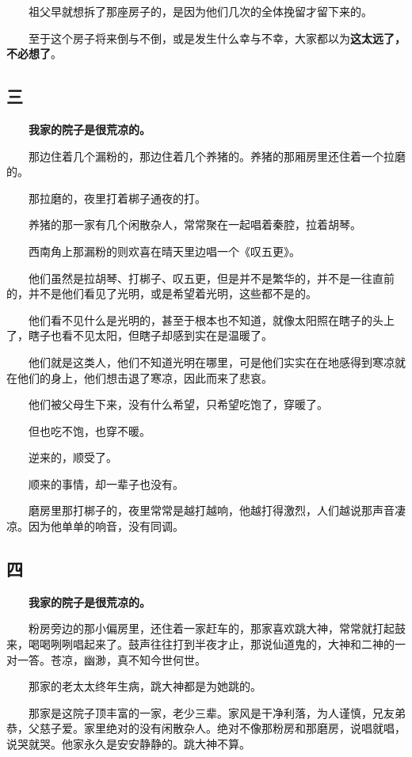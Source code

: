\documentclass[UTF8]{ctexart}
\begin{document}
　　祖父早就想拆了那座房子的，是因为他们几次的全体挽留才留下来的。

　　至于这个房子将来倒与不倒，或是发生什么幸与不幸，大家都以为\textbf{这太远了，不必想了}。

\subsection{三}

　　\textbf{我家的院子是很荒凉的。}

　　那边住着几个漏粉的，那边住着几个养猪的。养猪的那厢房里还住着一个拉磨的。

　　那拉磨的，夜里打着梆子通夜的打。

　　养猪的那一家有几个闲散杂人，常常聚在一起唱着秦腔，拉着胡琴。

　　西南角上那漏粉的则欢喜在晴天里边唱一个《叹五更》。

　　他们虽然是拉胡琴、打梆子、叹五更，但是并不是繁华的，并不是一往直前的，并不是他们看见了光明，或是希望着光明，这些都不是的。

　　他们看不见什么是光明的，甚至于根本也不知道，就像太阳照在瞎子的头上了，瞎子也看不见太阳，但瞎子却感到实在是温暖了。

　　他们就是这类人，他们不知道光明在哪里，可是他们实实在在地感得到寒凉就在他们的身上，他们想击退了寒凉，因此而来了悲哀。

　　他们被父母生下来，没有什么希望，只希望吃饱了，穿暖了。

　　但也吃不饱，也穿不暖。

　　逆来的，顺受了。

　　顺来的事情，却一辈子也没有。

　　磨房里那打梆子的，夜里常常是越打越响，他越打得激烈，人们越说那声音凄凉。因为他单单的响音，没有同调。

\subsection{四}

　　\textbf{我家的院子是很荒凉的。}

　　粉房旁边的那小偏房里，还住着一家赶车的，那家喜欢跳大神，常常就打起鼓来，喝喝咧咧唱起来了。鼓声往往打到半夜才止，那说仙道鬼的，大神和二神的一对一答。苍凉，幽渺，真不知今世何世。

　　那家的老太太终年生病，跳大神都是为她跳的。

　　那家是这院子顶丰富的一家，老少三辈。家风是干净利落，为人谨慎，兄友弟恭，父慈子爱。家里绝对的没有闲散杂人。绝对不像那粉房和那磨房，说唱就唱，说哭就哭。他家永久是安安静静的。跳大神不算。
\end{document}
